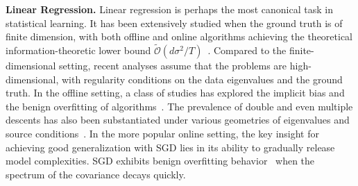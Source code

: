 
\noindent \textbf{Linear Regression.} 
\iffalse
Linear regression is perhaps the most canonical task in statistical learning. It has been extensively studied when the ground truth is of finite dimension, with both offline and online algorithms achieving the theoretical information-theoretic lower bound  $\widetilde{\mathcal{O}}\left(d\sigma^2/T\right)$~\citep{bach2013non,jain2018parallelizing,ge2019step}.  
Compared to the finite-dimensional setting, recent analyses assume that the problems are high-dimensional, with regularity conditions on the data eigenvalues and the ground truth.
In the offline setting, a class of studies has explored the implicit bias and the benign overfitting of algorithms~\citep{raskutti2014early,gunasekar2017implicit,Bartlett_2020,10.1214/21-AOS2133,tsigler2023benign}. 
The prevalence of double and even multiple descents has also been substantiated under various geometries of eigenvalues and source conditions~\citep{liang2020multiple,10.1214/20-AOS1990,mei2022generalization,lu2023optimal,zhang2024optimal1}.
In the more popular online setting, the key insight for achieving good generalization with SGD lies in its ability to gradually release model complexities. SGD exhibits benign overfitting behavior~\citep{dieuleveut2016nonparametric,dieuleveut2017harder,lin2017optimal,ali2020implicit,zou2021benefits, zou2021benign, wu2022last,varre2021last} when the spectrum of the covariance decays quickly.
